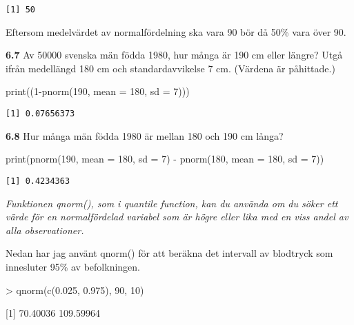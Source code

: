 \documentclass[
  letterpaper,
  DIV=11,
  numbers=noendperiod]{scrartcl}
\newenvironment{Shaded}{\begin{snugshade}}{\end{snugshade}}
\newcommand{\AttributeTok}[1]{\textcolor[rgb]{0.40,0.45,0.13}{#1}}
\newcommand{\DecValTok}[1]{\textcolor[rgb]{0.68,0.00,0.00}{#1}}
\newcommand{\FunctionTok}[1]{\textcolor[rgb]{0.28,0.35,0.67}{#1}}
\newcommand{\NormalTok}[1]{\textcolor[rgb]{0.00,0.23,0.31}{#1}}
\newcommand{\SpecialCharTok}[1]{\textcolor[rgb]{0.37,0.37,0.37}{#1}}
\begin{document}
\begin{verbatim}
[1] 50
\end{verbatim}

Eftersom medelvärdet av normalfördelning ska vara 90 bör då 50\% vara
över 90.

\textbf{6.7} Av 50000 svenska män födda 1980, hur många är 190 cm eller
längre? Utgå ifrån medellängd 180 cm och standardavvikelse 7 cm.
(Värdena är påhittade.)

\begin{Shaded}
\begin{Highlighting}[]
\FunctionTok{print}\NormalTok{((}\DecValTok{1}\SpecialCharTok{{-}}\FunctionTok{pnorm}\NormalTok{(}\DecValTok{190}\NormalTok{, }\AttributeTok{mean =} \DecValTok{180}\NormalTok{, }\AttributeTok{sd =} \DecValTok{7}\NormalTok{)))}
\end{Highlighting}
\end{Shaded}

\begin{verbatim}
[1] 0.07656373
\end{verbatim}

\textbf{6.8} Hur många män födda 1980 är mellan 180 och 190 cm långa?

\begin{Shaded}
\begin{Highlighting}[]
\FunctionTok{print}\NormalTok{(}\FunctionTok{pnorm}\NormalTok{(}\DecValTok{190}\NormalTok{, }\AttributeTok{mean =} \DecValTok{180}\NormalTok{, }\AttributeTok{sd =} \DecValTok{7}\NormalTok{) }\SpecialCharTok{{-}} \FunctionTok{pnorm}\NormalTok{(}\DecValTok{180}\NormalTok{, }\AttributeTok{mean =} \DecValTok{180}\NormalTok{, }\AttributeTok{sd =} \DecValTok{7}\NormalTok{))}
\end{Highlighting}
\end{Shaded}

\begin{verbatim}
[1] 0.4234363
\end{verbatim}

\emph{Funktionen qnorm(), som i quantile function, kan du använda om du
söker ett värde för en normalfördelad variabel som är högre eller lika
med en viss andel av alla observationer.}

Nedan har jag använt qnorm() för att beräkna det intervall av blodtryck
som innesluter 95\% av befolkningen.

\textgreater{} qnorm(c(0.025, 0.975), 90, 10)

{[}1{]} 70.40036 109.59964
\end{document}
